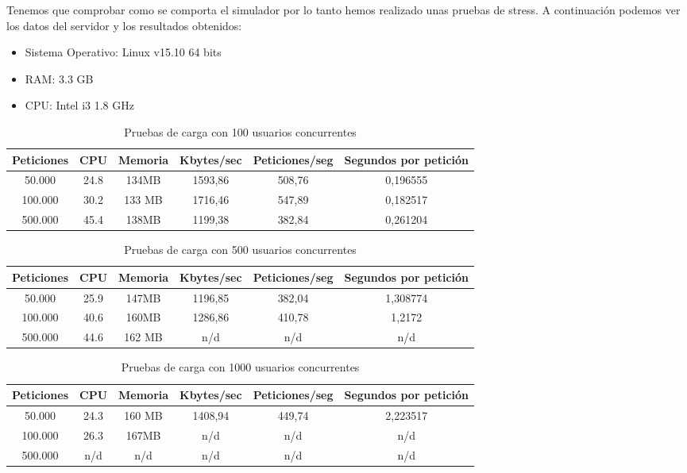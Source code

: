 Tenemos que comprobar como se comporta el simulador por lo tanto hemos realizado unas pruebas de stress. A continuación podemos ver los datos del servidor y los resultados obtenidos:

\begin{itemize}
	\item Sistema Operativo: Linux v15.10 64 bits
	\item RAM: 3.3 GB
	\item CPU: Intel i3 1.8 GHz
\end{itemize}

\begin{table}[H]
	\begin{center}
		\begin{tabular}{|c|c|c|c|c|c|}\hline
			Peticiones & CPU & Memoria & Kbytes/sec & Peticiones/seg & Segundos por petición \\ \hline
			50.000 & 24.8 & 134MB & 1593,86 & 508,76 & 0,196555 \\ \hline
			100.000 & 30.2 & 133 MB & 1716,46 & 547,89 & 0,182517 \\ \hline
			500.000 & 45.4 & 138MB & 1199,38 & 382,84 & 0,261204 \\ \hline
		\end{tabular}
		\caption{Pruebas de carga con 100 usuarios concurrentes}
		\label{tabla:CienteUsuarios}
	\end{center}
\end{table}

\begin{table}[H]
	\begin{center}
		\begin{tabular}{|c|c|c|c|c|c|} 	\hline
			Peticiones & CPU & Memoria & Kbytes/sec & Peticiones/seg & Segundos por petición \\ \hline
			50.000 & 25.9 & 147MB & 1196,85 & 382,04 & 1,308774 \\ \hline
			100.000 & 40.6 & 160MB & 1286,86 & 410,78 & 1,2172 \\ \hline
			500.000 & 44.6 & 162 MB & n/d & n/d & n/d \\ \hline
		\end{tabular}
		\caption{Pruebas de carga con 500 usuarios concurrentes}
		\label{tabla:QuinientosUsuarios}
	\end{center}
\end{table}

\begin{table}[H]
	\begin{center}
		\begin{tabular}{|c|c|c|c|c|c|} \hline
			Peticiones & CPU & Memoria & Kbytes/sec & Peticiones/seg & Segundos por petición \\ \hline
			50.000 & 24.3 & 160 MB & 1408,94 & 449,74 & 2,223517 \\ \hline
			100.000 & 26.3 & 167MB & n/d & n/d & n/d \\ \hline
			500.000 & n/d & n/d & n/d & n/d & n/d \\ \hline
		\end{tabular}
		\caption{Pruebas de carga con 1000 usuarios concurrentes}
		\label{tabla:MilUsuarios}
	\end{center}
\end{table}

